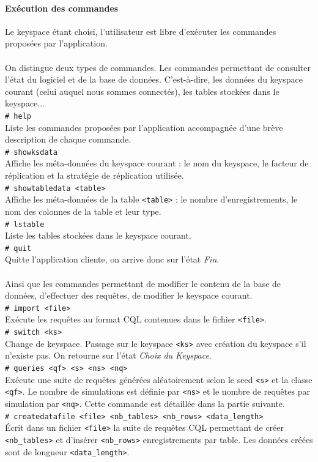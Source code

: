 \documentclass[12pt]{article}
\newcommand{\shellcmd}[1]{\\\indent\indent\texttt{\footnotesize\# #1}\\}
\begin{document}
\paragraph{Exécution des commandes} Le keyspace étant choisi, l'utilisateur est libre d'exécuter les commandes proposées par l'application.
\paragraph{} On distingue deux types de commandes. Les commandes permettant de consulter l'état du logiciel et de la base de données. 
C'est-à-dire, les données du keyspace courant (celui auquel nous sommes connectés), les tables stockées dans le keyspace...
\newline
\shellcmd{help}
Liste les commandes proposées par l'application accompagnée d'une brève description de chaque commande.
\shellcmd{showksdata}
Affiche les méta-données du keyspace courant : le nom du keyspace, le facteur de réplication et la stratégie de réplication utilisée.
\shellcmd{showtabledata <table>}
Affiche les méta-données de la table \texttt{<table>} : le nombre d'enregistrements, le nom des colonnes de la table et leur type.
\shellcmd{lstable}
Liste les tables stockées dans le keyspace courant.
\shellcmd{quit}
Quitte l'application cliente, on arrive donc sur l'état \textit{Fin}.

\paragraph{} Ainsi que les commandes permettant de modifier le contenu de la base de données, d'effectuer des requêtes, de modifier le keyspace courant.
\newline
\shellcmd{import <file>}
Exécute les requêtes au format CQL contenues dans le fichier \texttt{<file>}.
\shellcmd{switch <ks>}
Change de keyspace. Passage sur le keyspace \texttt{<ks>} avec création du keyspace s'il n'existe pas. On retourne sur l'état \textit{Choix du Keyspace}.
\shellcmd{queries <qf> <s> <ns> <nq>}
Exécute une suite de requêtes générées aléatoirement selon le seed \texttt{<s>} et la classe \texttt{<qf>}. Le nombre de simulations est définie par \texttt{<ns>} et le nombre de requêtes par simulation par \texttt{<nq>}. Cette commande est détaillée dans la partie suivante.
\shellcmd{createdatafile  <file> <nb\_tables> <nb\_rows> <data\_length>}
Écrit dans un fichier \texttt{<file>} la suite de requêtes CQL permettant de créer \texttt{<nb\_tables>} et d'insérer \texttt{<nb\_rows>} enregistrements par table. Les données créées sont de longueur \texttt{<data\_length>}.
 
\end{document}
